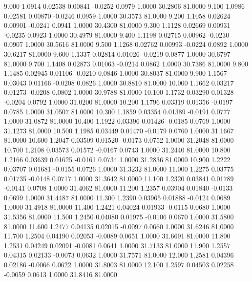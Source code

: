    9.000   1.0914   0.02538   0.00841  -0.0252   0.0979   1.0000  30.2806  81.0000
   9.100   1.0986   0.02581   0.00870  -0.0246   0.0959   1.0000  30.3573  81.0000
   9.200   1.1058   0.02624   0.00901  -0.0241   0.0941   1.0000  30.4300  81.0000
   9.300   1.1128   0.02669   0.00931  -0.0235   0.0923   1.0000  30.4979  81.0000
   9.400   1.1198   0.02715   0.00962  -0.0230   0.0907   1.0000  30.5616  81.0000
   9.500   1.1268   0.02762   0.00993  -0.0224   0.0892   1.0000  30.6217  81.0000
   9.600   1.1337   0.02814   0.01026  -0.0219   0.0877   1.0000  30.6797  81.0000
   9.700   1.1408   0.02873   0.01063  -0.0214   0.0862   1.0000  30.7386  81.0000
   9.800   1.1485   0.02945   0.01106  -0.0210   0.0846   1.0000  30.8037  81.0000
   9.900   1.1567   0.03043   0.01166  -0.0208   0.0826   1.0000  30.8810  81.0000
  10.000   1.1662   0.03217   0.01273  -0.0208   0.0802   1.0000  30.9788  81.0000
  10.100   1.1732   0.03290   0.01328  -0.0204   0.0792   1.0000  31.0200  81.0000
  10.200   1.1796   0.03319   0.01356  -0.0197   0.0785   1.0000  31.0507  81.0000
  10.300   1.1859   0.03354   0.01389  -0.0191   0.0777   1.0000  31.0872  81.0000
  10.400   1.1922   0.03396   0.01426  -0.0185   0.0769   1.0000  31.1273  81.0000
  10.500   1.1985   0.03449   0.01470  -0.0179   0.0760   1.0000  31.1667  81.0000
  10.600   1.2047   0.03509   0.01520  -0.0173   0.0752   1.0000  31.2048  81.0000
  10.700   1.2108   0.03573   0.01572  -0.0167   0.0743   1.0000  31.2440  81.0000
  10.800   1.2166   0.03639   0.01625  -0.0161   0.0734   1.0000  31.2836  81.0000
  10.900   1.2222   0.03707   0.01681  -0.0155   0.0726   1.0000  31.3232  81.0000
  11.000   1.2275   0.03775   0.01735  -0.0148   0.0717   1.0000  31.3642  81.0000
  11.100   1.2320   0.03841   0.01789  -0.0141   0.0708   1.0000  31.4062  81.0000
  11.200   1.2357   0.03904   0.01840  -0.0133   0.0699   1.0000  31.4487  81.0000
  11.300   1.2390   0.03965   0.01888  -0.0124   0.0689   1.0000  31.4918  81.0000
  11.400   1.2421   0.04024   0.01933  -0.0115   0.0680   1.0000  31.5356  81.0000
  11.500   1.2450   0.04080   0.01975  -0.0106   0.0670   1.0000  31.5800  81.0000
  11.600   1.2477   0.04135   0.02015  -0.0097   0.0660   1.0000  31.6246  81.0000
  11.700   1.2504   0.04190   0.02053  -0.0089   0.0651   1.0000  31.6691  81.0000
  11.800   1.2531   0.04249   0.02091  -0.0081   0.0641   1.0000  31.7133  81.0000
  11.900   1.2557   0.04315   0.02133  -0.0073   0.0632   1.0000  31.7571  81.0000
  12.000   1.2581   0.04396   0.02186  -0.0066   0.0622   1.0000  31.8003  81.0000
  12.100   1.2597   0.04503   0.02258  -0.0059   0.0613   1.0000  31.8416  81.0000
